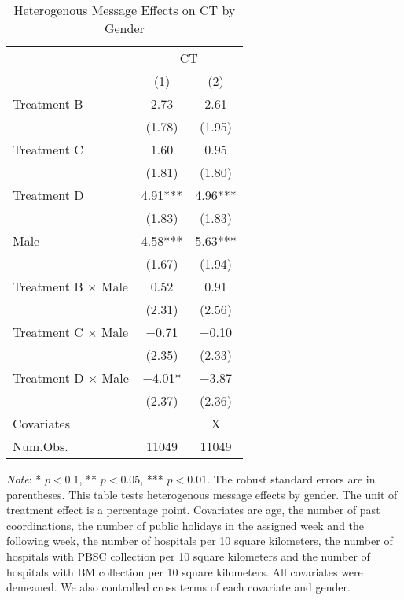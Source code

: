 \documentclass[12pt, a4paper]{article}
\begin{document}
\begin{table}[H]

\caption{\label{tab:lm-interaction-gender-test}Heterogenous Message Effects on CT by Gender}
\centering
\fontsize{8}{10}\selectfont
\begin{threeparttable}
\begin{tabular}[t]{lcc}
\toprule
\multicolumn{1}{c}{ } & \multicolumn{2}{c}{CT} \\
\cmidrule(l{3pt}r{3pt}){2-3}
  & (1) & (2)\\
\midrule
Treatment B & \num{2.73} & \num{2.61}\\
 & (\num{1.78}) & (\num{1.95})\\
Treatment C & \num{1.60} & \num{0.95}\\
 & (\num{1.81}) & (\num{1.80})\\
Treatment D & \num{4.91}*** & \num{4.96}***\\
 & (\num{1.83}) & (\num{1.83})\\
Male & \num{4.58}*** & \num{5.63}***\\
 & (\num{1.67}) & (\num{1.94})\\
Treatment B $\times$ Male & \num{0.52} & \num{0.91}\\
 & (\num{2.31}) & (\num{2.56})\\
Treatment C $\times$ Male & \num{-0.71} & \num{-0.10}\\
 & (\num{2.35}) & (\num{2.33})\\
Treatment D $\times$ Male & \num{-4.01}* & \num{-3.87}\\
 & (\num{2.37}) & (\num{2.36})\\
\midrule
Covariates &  & X\\
Num.Obs. & \num{11049} & \num{11049}\\
\bottomrule
\end{tabular}
\begin{tablenotes}
\item \emph{Note}: * $p < 0.1$, ** $p < 0.05$, *** $p < 0.01$. The robust standard errors are in parentheses. This table tests heterogenous message effects by gender. The unit of treatment effect is a percentage point. Covariates are age, the number of past coordinations, the number of public holidays in the assigned week and the following week, the number of hospitals per 10 square kilometers, the number of hospitals with PBSC collection per 10 square kilometers and the number of hospitals with BM collection per 10 square kilometers. All covariates were demeaned. We also controlled cross terms of each covariate and gender.
\end{tablenotes}
\end{threeparttable}
\end{table}
\end{document}
